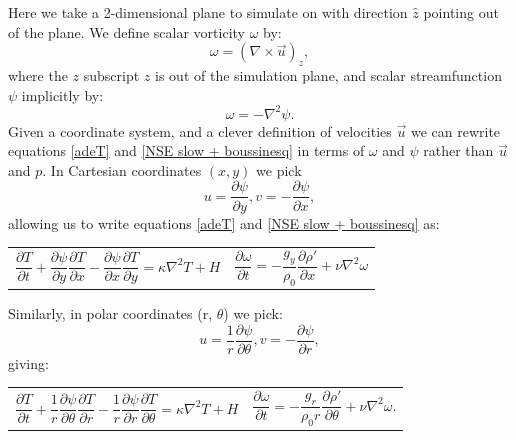 \documentclass{article}
\begin{document}
Here we take a 2-dimensional plane to simulate on with direction $\hat{z}$ pointing out of the plane. We define scalar vorticity $\omega$ by:
\begin{equation}
	\omega = (\nabla \times \vec{u})_z,
	\label{omega}
\end{equation}
where the $z$ subscript $z$ is out of the simulation plane, and scalar streamfunction $\psi$ implicitly by:
\begin{equation}
	\omega = - \nabla^2 \psi.
	\label{psi}
\end{equation}
Given a coordinate system, and a clever definition of velocities $\vec{u}$ we can rewrite equations \ref{adeT} and \ref{NSE slow + boussinesq} in terms of $\omega$ and $\psi$ rather than $\vec{u}$ and $p$. In Cartesian coordinates $(x,y)$ we pick 
\begin{equation}
	u = \frac{\partial \psi}{\partial y}, v = -\frac{\partial \psi}{\partial x},
	\label{cartesian velocities}
\end{equation}
allowing us to write equations \ref{adeT} and \ref{NSE slow + boussinesq} as:
\begin{tabularx}{\textwidth}{XX}
\begin{equation}
	\frac{\partial T}{\partial t} + \frac{\partial \psi}{\partial y} \frac{\partial T}{\partial x} - \frac{\partial \psi}{\partial x} \frac{\partial T}{\partial y} = \kappa \nabla^2 T + H
	\label{adeT sfvt cartesian}
\end{equation}
    &
\begin{equation}
	\frac{\partial \omega}{\partial t} = -\frac{g_y}{\rho_0} \frac{\partial \rho'}{\partial x} + \nu \nabla^2 \omega
	\label{NSE slow + boussinesq sfvt cartesian}
\end{equation}
\end{tabularx}\par
Similarly, in polar coordinates (r, $\theta$) we pick:
\begin{equation}
	u = \frac{1}{r} \frac{\partial \psi}{\partial \theta}, v = -\frac{\partial \psi}{\partial r},
	\label{polar velocities}
\end{equation}
giving:
\begin{tabularx}{\textwidth}{XX}
\begin{equation}
	\frac{\partial T}{\partial t} + \frac{1}{r} \frac{\partial \psi}{\partial \theta} \frac{\partial T}{\partial r} - \frac{1}{r} \frac{\partial \psi}{\partial r} \frac{\partial T}{\partial \theta} = \kappa \nabla^2 T + H
	\label{adeT sfvt polar}
\end{equation}
    &
\begin{equation}
	\frac{\partial \omega}{\partial t} = - \frac{g_r}{\rho_0 r} \frac{\partial \rho'}{\partial \theta} +\nu \nabla^2 \omega.
	\label{NSE slow + boussinesq sfvt polar}
\end{equation}
\end{tabularx}\par
\end{document}

